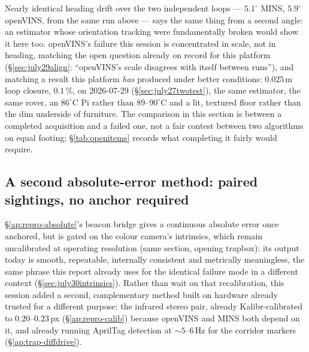 Nearly identical heading drift over the two independent loops --- $5.1^\circ$
MINS, $5.9^\circ$ openVINS, from the same  run above
--- says the same thing from a second angle: an estimator whose orientation
tracking were fundamentally broken would show it here too. openVINS's
failure this session is concentrated in scale, not in heading, matching the
open question already on record for this platform
(\S\ref{sec:july29align}: ``openVINS's scale disagrees with itself between
runs''), and matching a result this platform \emph{has} produced under
better conditions: $0.025$\,m loop closure, $0.1\,\%$, on 2026-07-29
(\S\ref{sec:july27twotest}), the same estimator, the same rover, an
$86^\circ$C Pi rather than $89$--$90^\circ$C and a lit, textured floor rather
than the dim underside of furniture. The comparison in this section is
between a completed acquisition and a failed one, not a fair contest between
two algorithms on equal footing; \S\ref{tab:openitems} records what
completing it fairly would require.

\subsection{A second absolute-error method: paired sightings, no anchor
required}
\label{sec:aug05beacon}
\S\ref{ap:repro-absolute}'s beacon bridge gives a continuous absolute error
once anchored, but is gated on the colour camera's intrinsics, which remain
uncalibrated at operating resolution (same section, opening trapbox): its
output today is smooth, repeatable, internally consistent and metrically
meaningless, the same phrase this report already uses for the identical
failure mode in a different context (\S\ref{sec:july30intrinsics}). Rather
than wait on that recalibration, this session added a second, complementary
method built on hardware already trusted for a different purpose: the
infrared stereo pair, already Kalibr-calibrated to $0.20$--$0.23$\,px
(\S\ref{ap:repro-calib}) because openVINS and MINS both depend on it, and
already running AprilTag detection at $\sim\!5$--$6$\,Hz for the corridor
markers (\S\ref{ap:trap-diffdrive}).

